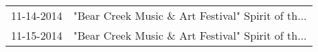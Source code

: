\begin{supertabular}{ll}
 11-14-2014 &  "Bear Creek Music \& Art Festival" Spirit of th... \\
 11-15-2014 &  "Bear Creek Music \& Art Festival" Spirit of th... \\
\end{supertabular}
